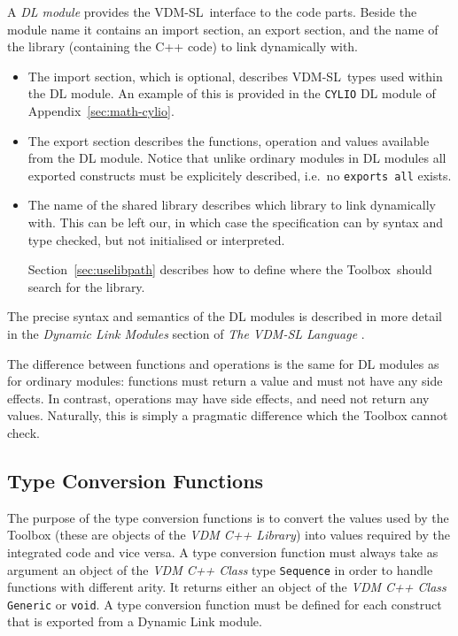 \documentclass[\pformat,12pt]{article}
\newcommand{\vdmslpp}{VDM-SL}
\newcommand{\Toolbox}{Toolbox}
\begin{document}
A {\em DL module} provides the \vdmslpp\ interface to the code parts.
Beside the module name it contains an import section, an export
section, and the name of the library (containing the C++ code) to link
dynamically with.
\begin{itemize}
\item The import section, which is optional, describes \vdmslpp\ types
  used within the DL module.  An example of this is provided in the
  {\tt CYLIO} DL module of Appendix~\ref{sec:math-cylio}.
\item The export section describes the functions, operation and values
  available from the DL module. Notice that unlike ordinary modules in
  DL modules all exported constructs must be explicitely described,
  i.e.\ no {\tt exports all} exists.
\item The name of the shared library describes which library to link
  dynamically with. This can be left our, in which case the
  specification can by syntax and type checked, but not initialised or
  interpreted.  
  
  Section~\ref{sec:uselibpath} describes how to define where the
  \Toolbox\ should search for the library.
\end{itemize}
The precise syntax and semantics of the DL modules is described in
more detail in the {\em Dynamic Link Modules} section of {\em The 
VDM-SL Language} \cite{LangMan-SCSK}.

The difference between functions and operations is the same for DL
modules as for ordinary modules: functions must return a value and
must not have any side effects. In contrast, operations may have side
effects, and need not return any values. Naturally, this is simply a
pragmatic difference which the Toolbox cannot check.


\subsection{Type Conversion Functions}

The purpose of the type conversion functions is to convert the values
used by the Toolbox (these are objects of the {\it VDM C++ Library})
into values required by the integrated code and vice versa.  A type
conversion function must always take as argument an object of the {\it
  VDM C++ Class} type {\tt Sequence} in order to handle functions with
different arity. It returns either an object of the {\it VDM C++
  Class} {\tt Generic} or {\tt void}. A type conversion function must
be defined for each construct that is exported from a Dynamic Link
module.
\end{document}
